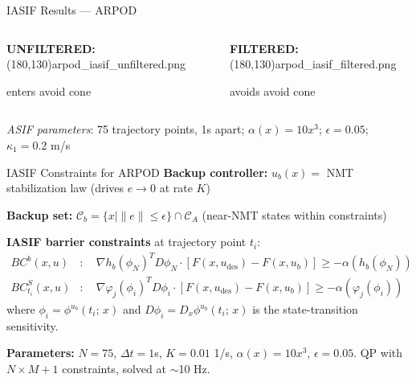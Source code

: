 \begin{frame}{IASIF Results --- ARPOD}
  \hypertarget{backup:arpod-results}{}
  \small
  \begin{columns}[c]
    \begin{column}{0.45\textwidth}
      \begin{center}
        \textbf{UNFILTERED:}
        \vskip4pt
        {\color{slate400}\framebox(180,130){arpod\_iasif\_unfiltered.png}}

        \vskip2pt
        {\scriptsize enters avoid cone}
      \end{center}
    \end{column}
    \begin{column}{0.45\textwidth}
      \begin{center}
        \textbf{FILTERED:}
        \vskip4pt
        {\color{slate400}\framebox(180,130){arpod\_iasif\_filtered.png}}

        \vskip2pt
        {\scriptsize avoids avoid cone}
      \end{center}
    \end{column}
  \end{columns}
  \vskip4pt
  \footnotesize
  \textit{ASIF parameters}: 75 trajectory points, 1s apart;\; $\alpha(x) = 10x^3$;\; $\epsilon = 0.05$;\; $\kappa_1 = 0.2$ m/s
\end{frame}

\begin{frame}{IASIF Constraints for ARPOD}
  \hypertarget{backup:arpod-iasif}{}
  \footnotesize
  \textbf{Backup controller:} $u_b(x) = $ NMT stabilization law (drives $e \to 0$ at rate $K$)

  \vskip2pt
  \textbf{Backup set:} $\mathcal{C}_b = \{x \mid \|e\| \leq \epsilon\} \cap \mathcal{C}_A$ \quad (near-NMT states within constraints)

  \vskip4pt
  \textbf{IASIF barrier constraints} at trajectory point $t_i$:
  \vskip-6pt
  \scriptsize
  \begin{align*}
    BC^b(x, u) &: \quad \nabla h_b(\phi_N)^T D\phi_N \cdot [F(x, u_{\text{des}}) - F(x, u_b)] \geq -\alpha(h_b(\phi_N)) \\
    BC^S_{t_i}(x, u) &: \quad \nabla \varphi_j(\phi_i)^T D\phi_i \cdot [F(x, u_{\text{des}}) - F(x, u_b)] \geq -\alpha(\varphi_j(\phi_i))
  \end{align*}
  \vskip2pt
  \footnotesize
  where $\phi_i = \phi^{u_b}(t_i;\, x)$ and $D\phi_i = D_x \phi^{u_b}(t_i;\, x)$ is the state-transition sensitivity.

  \vskip2pt
  \scriptsize
  \textbf{Parameters:} $N = 75$, $\Delta t = 1$s, $K = 0.01$ 1/s, $\alpha(x) = 10x^3$, $\epsilon = 0.05$. \quad QP with $N \!\times\! M + 1$ constraints, solved at $\sim$10 Hz.
\end{frame}
